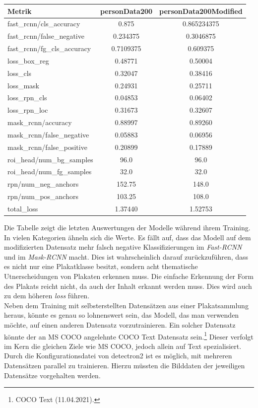 \documentclass[a4paper,12pt,ngerman]{article}
\begin{document}
\begin{tabular}[h]{l|c|c}
	Metrik & personData200 & personData200Modified \\
	\hline
	fast\_rcnn/cls\_accuracy & 0.875 & 0.865234375 \\
	fast\_rcnn/false\_negative & 0.234375 & 0.3046875 \\
	fast\_rcnn/fg\_cls\_accuracy & 0.7109375 & 0.609375 \\
	\hline
	loss\_box\_reg & 0.48771 & 0.50004 \\
	loss\_cls & 0.32047 & 0.38416 \\
	loss\_mask & 0.24931 & 0.25711 \\
	loss\_rpn\_cls & 0.04853 & 0.06402 \\
	loss\_rpn\_loc & 0.31673 & 0.32607 \\
	\hline
	mask\_rcnn/accuracy & 0.88997 & 0.89260 \\
	mask\_rcnn/false\_negative & 0.05883 & 0.06956 \\
	mask\_rcnn/false\_positive & 0.20899 & 0.17889 \\
	\hline
	roi\_head/num\_bg\_samples & 96.0 & 96.0 \\
	roi\_head/num\_fg\_samples & 32.0 & 32.0 \\
	\hline
	rpn/num\_neg\_anchors & 152.75 & 148.0 \\
	rpn/num\_pos\_anchors & 103.25 & 108.0 \\
	\hline
	total\_loss & 1.37440 & 1.52753
\end{tabular}
\linebreak
\linebreak
Die Tabelle zeigt die letzten Auswertungen der Modelle während ihrem Training. In vielen Kategorien ähneln sich die Werte. Es fällt auf, dass das Modell auf dem modifizierten Datensatz mehr falsch negative Klassifizierungen im \textit{Fast-RCNN} und im \textit{Mask-RCNN} macht. Dies ist wahrscheinlich darauf zurückzuführen, dass es nicht nur eine Plakatklasse besitzt, sondern acht thematische Utnerscheidungen von Plakaten erkennen muss. Die einfache Erkennung der Form des Plakats reicht nicht, da auch der Inhalt erkannt werden muss. Dies wird auch zu dem höheren \textit{loss} führen. \\
Neben dem Training mit selbsterstellten Datensätzen aus einer Plakatsammlung heraus, könnte es genau so lohnenswert sein, das Modell, das man verwenden möchte, auf einen anderen Datensatz vorzutrainieren. Ein solcher Datensatz könnte der an MS COCO angelehnte COCO Text Datensatz sein.\footnote{COCO Text (11.04.2021).} Dieser verfolgt im Kern die gleichen Ziele wie MS COCO, jedoch allein auf Text spezialisiert. Durch die Konfigurationsdatei von detectron2 ist es möglich, mit mehreren Datensätzen parallel zu trainieren. Hierzu müssten die Bilddaten der jeweiligen Datensätze vorgehalten werden. \\
\end{document}
